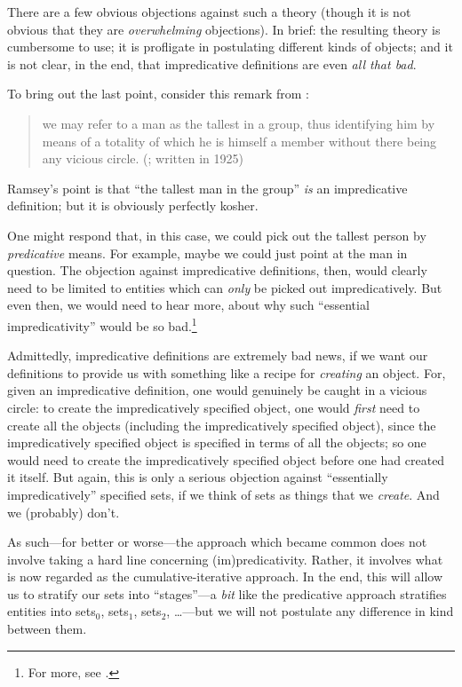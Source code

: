 \documentclass[../../../include/open-logic-section]{subfiles}
\begin{document}
There are a few obvious objections against such a theory (though it is
not obvious that they are \emph{overwhelming} objections). In brief:
the resulting theory is cumbersome to use; it is profligate in
postulating different kinds of objects; and it is not clear, in the
end, that impredicative definitions are even  \emph{all that bad}. 
	
To bring out the last point, consider this remark from
\citeauthor{Ramsey1925}:
\begin{quote}
	we may refer to a man as the tallest in a group, thus identifying him by means of a totality of which he is himself a member without there being any vicious circle. (\citealt{Ramsey1925}; written in 1925)
\end{quote}
Ramsey's point is that ``the tallest man in the group'' \emph{is} an
impredicative definition; but it is obviously perfectly kosher. 

One might respond that, in this case, we could pick out the tallest
person by \emph{predicative} means. For example, maybe we could just
point at the man in question. The objection against impredicative
definitions, then, would clearly need to be limited to entities which
can \emph{only} be picked out impredicatively. But even then, we would
need to hear more, about why such ``essential impredicativity'' would
be so bad.\footnote{For more, see \citet{2010}.}

Admittedly, impredicative definitions are extremely bad news, if we
want our definitions to provide us with something like a recipe for
\emph{creating} an object. For, given an impredicative definition, one
would genuinely be caught in a vicious circle: to create the
impredicatively specified object, one would \emph{first} need to
create all the objects (including the impredicatively specified
object), since the impredicatively specified object is specified in
terms of all the objects; so one would need to create the
impredicatively specified object before one had created it itself. But
again, this is only a serious objection against ``essentially
impredicatively'' specified sets, if we think of sets as things that
we \emph{create}. And we (probably) don't.

As such---for better or worse---the approach which became common does
not involve taking a hard line concerning (im)predicativity. Rather,
it involves what is now regarded as the cumulative-iterative approach.
In the end, this will allow us to stratify our sets into
``stages''---a \emph{bit} like the predicative approach stratifies
entities into sets$_0$, sets$_1$, sets$_2$, \ldots---but we will not
postulate any difference in kind between them. 
\end{document}
